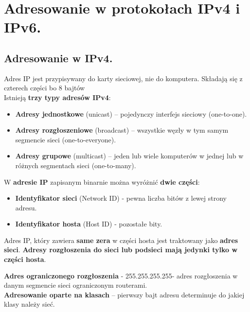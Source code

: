 \documentclass[main.tex]{subfiles}
\begin{document}
    \section{Adresowanie w protokołach IPv4 i IPv6.}

    \subsection{Adresowanie w IPv4.}
    Adres IP jest przypisywany do karty sieciowej, nie do komputera. Składają się z czterech części bo 8 bajtów\\

    \noindent Istnieją \textbf{trzy typy adresów IPv4}:
    \begin{itemize}[noitemsep]
        \item \textbf{Adresy jednostkowe} (unicast) – pojedynczy interfejs sieciowy (one-to-one).
        \item \textbf{Adresy rozgłoszeniowe} (broadcast) – wszystkie węzły w tym samym segmencie sieci (one-to-everyone).
        \item \textbf{Adresy grupowe} (multicast) – jeden lub wiele komputerów w jednej lub w różnych segmentach sieci (one-to-many).
    \end{itemize}

    \noindent W \textbf{adresie IP} zapisanym binarnie można wyróżnić \textbf{dwie części}:
    \begin{itemize}[noitemsep]
        \item \textbf{Identyfikator sieci} (Network ID) - pewna liczba bitów z lewej strony adresu.
        \item \textbf{Identyfikator hosta} (Host ID) - pozostałe bity.
    \end{itemize}
    Adres IP, który zawiera \textbf{same zera} w części hosta jest traktowany jako \textbf{adres sieci}.
    \textbf{Adresy rozgłoszenia do sieci lub podsieci mają jedynki tylko w części hosta}.

    \textbf{Adres ograniczonego rozgłoszenia} - 255.255.255.255- adres rozgłoszenia
    w danym segmencie sieci ograniczonym routerami.\\

    \noindent \textbf{Adresowanie oparte na klasach} -- pierwszy bajt adresu determinuje do jakiej klasy należy sieć.
\end{document}
